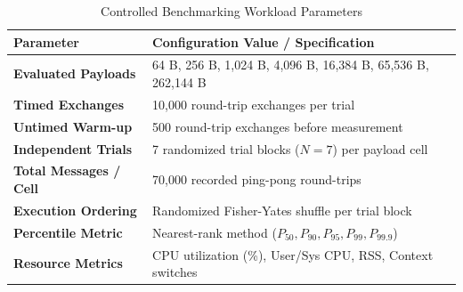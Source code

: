 \begin{table}[t]
\centering
\caption{Controlled Benchmarking Workload Parameters}
\label{tab:benchmark_config}
\scriptsize
\begin{tabular}{ll}
\toprule
\textbf{Parameter} & \textbf{Configuration Value / Specification} \\
\midrule
\textbf{Evaluated Payloads} & 64 B, 256 B, 1,024 B, 4,096 B, 16,384 B, 65,536 B, 262,144 B \\
\textbf{Timed Exchanges} & 10,000 round-trip exchanges per trial \\
\textbf{Untimed Warm-up} & 500 round-trip exchanges before measurement \\
\textbf{Independent Trials} & 7 randomized trial blocks ($N=7$) per payload cell \\
\textbf{Total Messages / Cell} & 70,000 recorded ping-pong round-trips \\
\textbf{Execution Ordering} & Randomized Fisher-Yates shuffle per trial block \\
\textbf{Percentile Metric} & Nearest-rank method ($P_{50}, P_{90}, P_{95}, P_{99}, P_{99.9}$) \\
\textbf{Resource Metrics} & CPU utilization (\%), User/Sys CPU, RSS, Context switches \\
\bottomrule
\end{tabular}
\end{table}
